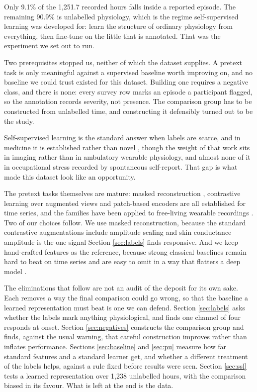 \documentclass{article}
\begin{document}
Only 9.1\% of the 1{,}251.7 recorded hours falls inside a reported episode. The
remaining 90.9\% is unlabelled physiology, which is the regime self-supervised
learning was developed for: learn the structure of ordinary physiology from
everything, then fine-tune on the little that is annotated. That was the
experiment we set out to run.

Two prerequisites stopped us, neither of which the dataset supplies. A pretext
task is only meaningful against a supervised baseline worth improving on, and
no baseline we could trust existed for this dataset. Building one requires a
negative class, and there is none: every survey row marks an episode a
participant flagged, so the annotation records severity, not presence. The
comparison group has to be constructed from unlabelled time, and constructing
it defensibly turned out to be the study.

Self-supervised learning is the standard answer when labels are scarce,
and in medicine it is established rather than novel \cite{krishnan2022},
though the weight of that work sits in imaging \cite{huang2023} rather
than in ambulatory wearable physiology, and almost none of it in
occupational stress recorded by spontaneous self-report. That gap is what
made this dataset look like an opportunity.

The pretext tasks themselves are mature: masked reconstruction
\cite{zerveas2021}, contrastive learning over augmented views
\cite{yue2021} and patch-based encoders \cite{nie2022} are all
established for time series, and the families have been applied to
free-living wearable recordings \cite{spathis2020, tang2020}. Two of our
choices follow. We use masked reconstruction, because the standard
contrastive augmentations include amplitude scaling and skin conductance
amplitude is the one signal Section \ref{sec:labels} finds responsive. And
we keep hand-crafted features as the reference, because strong classical
baselines remain hard to beat on time series \cite{dempster2020,
fawaz2019, fawaz2020} and are easy to omit in a way that flatters a deep
model \cite{zeng2022}.

The eliminations that follow are not an audit of the deposit for its own
sake. Each removes a way the final comparison could go wrong, so that the
baseline a learned representation must beat is one we can defend. Section \ref{sec:labels} asks whether the labels
mark anything physiological, and finds one channel of four responds at
onset. Section \ref{sec:negatives} constructs the comparison group and
finds, against the usual warning, that careful construction improves
rather than inflates performance. Sections \ref{sec:baseline} and
\ref{sec:pu} measure how far standard features and a standard learner
get, and whether a different treatment of the labels helps, against a rule
fixed before results were seen. Section \ref{sec:ssl} tests a learned
representation over 1{,}238 unlabelled hours, with the comparison biased
in its favour. What is left at the end is the data.
\end{document}
